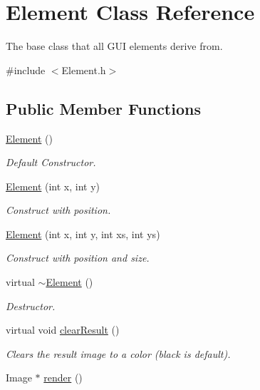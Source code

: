 \hypertarget{class_element}{\section{Element Class Reference}
\label{class_element}
}


The base class that all G\-U\-I elements derive from.  




{\ttfamily \#include $<$Element.\-h$>$}

\subsection*{Public Member Functions}
\begin{DoxyCompactItemize}
\item 
\hyperlink{class_element_ab0d0e20be9a36ae676202db753faeec9}{Element} ()
\begin{DoxyCompactList}\small\item\em Default Constructor. \end{DoxyCompactList}\item 
\hyperlink{class_element_ae385b104c66f092731777d70775b7f55}{Element} (int x, int y)
\begin{DoxyCompactList}\small\item\em Construct with position. \end{DoxyCompactList}\item 
\hyperlink{class_element_aabaef3fcc0959ea3c5b43f59522d0a1e}{Element} (int x, int y, int xs, int ys)
\begin{DoxyCompactList}\small\item\em Construct with position and size. \end{DoxyCompactList}\item 
virtual \hyperlink{class_element_a13d54ba9c08b6bec651402f1c2bb002c}{$\sim$\-Element} ()
\begin{DoxyCompactList}\small\item\em Destructor. \end{DoxyCompactList}\item 
virtual void \hyperlink{class_element_a7a110bce4630cd7b35b1c2d401774598}{clear\-Result} ()
\begin{DoxyCompactList}\small\item\em Clears the result image to a color (black is default). \end{DoxyCompactList}\item 
Image $\ast$ \hyperlink{class_element_a2410f72a9b5abcf43641ef1b9e50f646}{render} ()

\end{DoxyCompactItemize}
